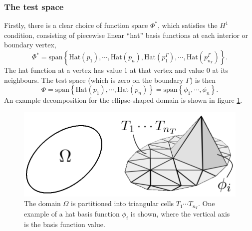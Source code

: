 \subsubsection{The test space}
Firstly, there is a clear choice of function space $\Phi^*$, which satisfies the $H^1$ condition, consisting of piecewise linear ``hat'' basis functions
at each interior or boundary vertex,
\newcommand{\hatfun}[1]{\text{Hat}(#1)}
$$
    \Phi^* = \text{span}\left\{
        \hatfun{p_1},\cdots,\hatfun{p_n},
        \hatfun{p^\Gamma_1},\cdots,\hatfun{p^\Gamma_{n_\Gamma}}
    \right\}.
$$
The hat function at a vertex has value $1$ at that vertex and value $0$ at its neighbours.
The test space (which is zero on the boundary $\Gamma$) is then
$$
    \Phi = \text{span}\left\{
        \hatfun{p_1},\cdots,\hatfun{p_n}
    \right\} = \text{span}\left\{\phi_1,\cdots,\phi_n\right\}.
$$
An example decomposition for the ellipse-shaped domain is shown in figure \ref{ellipse_partition}.
\begin{figure}[H]
    \begin{center}
        \includegraphics[width=0.53\linewidth]{figures/hat.png}
    \end{center}
    \caption{\scriptsize
        The domain $\Omega$ is partitioned into triangular cells $T_1\cdots T_{n_T}$. One example of a hat basis function $\phi_i$ is shown, where
        the vertical axis is the basis function value.
    }
    \label{ellipse_partition}
\end{figure}

